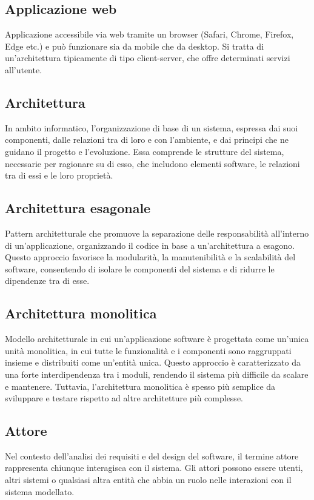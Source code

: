 \hypertarget{sec:applicazione_web}{}
\subsection*{Applicazione web}
Applicazione accessibile via web tramite un browser (Safari, Chrome, Firefox, Edge etc.) e può funzionare sia da mobile che da desktop. Si tratta di un'architettura 
tipicamente di tipo client-server, che offre determinati servizi all'utente.

\hypertarget{sec:architettura}{}
\subsection*{Architettura}
In ambito informatico, l'organizzazione di base di un sistema, espressa dai suoi componenti, dalle relazioni tra di loro e con l'ambiente, 
e dai principi che ne guidano il progetto e l'evoluzione. Essa comprende le strutture del sistema, necessarie per ragionare su di esso, 
che includono elementi software, le relazioni tra di essi e le loro proprietà.

\hypertarget{sec:architettura_esagonale}{}
\subsection*{Architettura esagonale}
Pattern architetturale che promuove la separazione delle responsabilità all'interno di un'applicazione, organizzando il codice in base a un'architettura
a esagono. Questo approccio favorisce la modularità, la manutenibilità e la scalabilità del software, consentendo di isolare le componenti del sistema e
di ridurre le dipendenze tra di esse.

\hypertarget{sec:architettura_monolitica}{}
\subsection*{Architettura monolitica}
Modello architetturale in cui un'applicazione software è progettata come un'unica unità monolitica, in cui tutte le funzionalità e i componenti sono
raggruppati insieme e distribuiti come un'entità unica. Questo approccio è caratterizzato da una forte interdipendenza tra i moduli, rendendo il sistema
più difficile da scalare e mantenere. Tuttavia, l'architettura monolitica è spesso più semplice da sviluppare e testare rispetto ad altre architetture
più complesse.

\hypertarget{sec:attore}{}
\subsection*{Attore}
Nel contesto dell'analisi dei requisiti e del design del software, il termine attore rappresenta chiunque interagisca con il sistema. Gli attori possono 
essere utenti, altri sistemi o qualsiasi altra entità che abbia un ruolo nelle interazioni con il sistema modellato.

